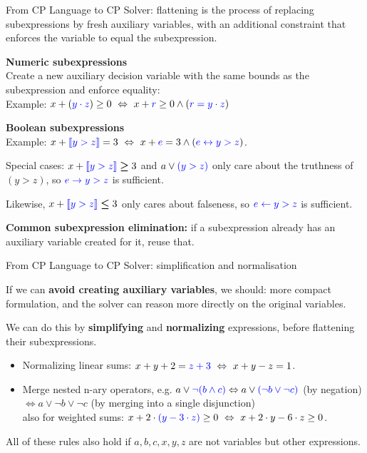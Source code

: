 \documentclass{cons-beamer}
\begin{document}
\begin{frame}{From CP Language to CP Solver: flattening}	
	 is the process of replacing subexpressions by fresh auxiliary variables, with an additional constraint that enforces the 
	variable to equal the subexpression.
	\vfill
	
	\textbf{Numeric subexpressions}\\
	Create a new auxiliary decision variable with the same bounds as the subexpression and enforce equality:\\
	Example: $x + (\textcolor{blue}{y \cdot z}) \geq 0 ~\Leftrightarrow~ x + \textcolor{blue}{r} \geq 0 \land (\textcolor{blue}{r = y \cdot z})$
	\vfill
	\pause
	
	\textbf{Boolean subexpressions}\\
	Example: $x + \textcolor{blue}{\llbracket y > z \rrbracket} = 3  ~\Leftrightarrow~ x + \textcolor{blue}{e} = 3 \land (\textcolor{blue}{e \leftrightarrow y > z})$.
	
	Special cases: $x + \textcolor{blue}{\llbracket y > z \rrbracket} \boldsymbol{\geq} 3$ and $a \lor \textcolor{blue}{(y > z)}$ only care about the truthness of $(y > z)$, so $\textcolor{blue}{e \rightarrow y > z}$ is sufficient.
	
	Likewise, $x + \textcolor{blue}{\llbracket y > z \rrbracket} \boldsymbol{\leq} 3$ only cares about falseness, so $\textcolor{blue}{e \leftarrow y > z}$ is sufficient.
	\vfill
	\pause
	
	\textbf{Common subexpression elimination:} if a subexpression already has an auxiliary variable created for it, reuse that.
	
\end{frame}


\begin{frame}{From CP Language to CP Solver: simplification and normalisation}
	
	If we can \textbf{avoid creating auxiliary variables}, we should: more compact formulation, and the solver can reason more directly on the original variables.
	\vfill
	
	We can do this by \textbf{simplifying} and \textbf{normalizing} expressions, before flattening their subexpressions.
	
	\begin{itemize}
		\item Normalizing linear sums: $x + y + 2 = \textcolor{blue}{z + 3} ~\Leftrightarrow~ x + y -z = 1$.
		\item Merge nested n-ary operators, e.g. $a \lor \textcolor{blue}{\neg (b \land c)} \Leftrightarrow a \lor \textcolor{blue}{(\neg b \lor \neg c)}$ (by negation) $\Leftrightarrow a \lor \neg b \lor \neg c$ (by merging into a single disjunction)\\
		also for weighted sums: $x + 2\cdot \textcolor{blue}{(y - 3\cdot z)} \geq 0 ~\Leftrightarrow~ x + 2\cdot y - 6\cdot z \geq 0$. 
	\end{itemize}
	\vfill
	
	All of these rules also hold if $a,b,c, x,y,z$ are not variables but other expressions.
\end{frame}
\end{document}
